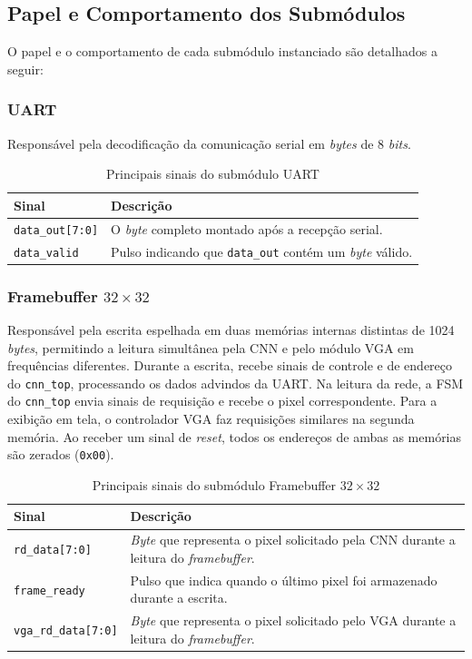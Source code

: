 \subsection{Papel e Comportamento dos Submódulos}

O papel e o comportamento de cada submódulo instanciado são detalhados a seguir:

\subsubsection{UART}
Responsável pela decodificação da comunicação serial em \textit{bytes} de 8 \textit{bits}.

\begin{table}[htbp]
\centering
\caption{Principais sinais do submódulo UART}
\label{tab:sinais_uart}
\small
\begin{tabularx}{\textwidth}{l X}
\toprule
\textbf{Sinal} & \textbf{Descrição} \\
\midrule
\texttt{data\_out[7:0]} & O \textit{byte} completo montado após a recepção serial. \\
\texttt{data\_valid} & Pulso indicando que \texttt{data\_out} contém um \textit{byte} válido. \\
\bottomrule
\end{tabularx}
\end{table}

\subsubsection{Framebuffer $32 \times 32$}
Responsável pela escrita espelhada em duas memórias internas distintas de 1024 \textit{bytes}, permitindo a leitura simultânea pela CNN e pelo módulo VGA em frequências diferentes. Durante a escrita, recebe sinais de controle e de endereço do \texttt{cnn\_top}, processando os dados advindos da UART. Na leitura da rede, a FSM do \texttt{cnn\_top} envia sinais de requisição e recebe o pixel correspondente. Para a exibição em tela, o controlador VGA faz requisições similares na segunda memória. Ao receber um sinal de \textit{reset}, todos os endereços de ambas as memórias são zerados (\texttt{0x00}).
\begin{table}[htbp]
\centering
\caption{Principais sinais do submódulo Framebuffer $32 \times 32$}
\label{tab:sinais_framebuffer}
\small
\begin{tabularx}{\textwidth}{l X}
\toprule
\textbf{Sinal} & \textbf{Descrição} \\
\midrule
\texttt{rd\_data[7:0]} & \textit{Byte} que representa o pixel solicitado pela CNN durante a leitura do \textit{framebuffer}. \\
\texttt{frame\_ready} & Pulso que indica quando o último pixel foi armazenado durante a escrita. \\
\texttt{vga\_rd\_data[7:0]} & \textit{Byte} que representa o pixel solicitado pelo VGA durante a leitura do \textit{framebuffer}. \\
\bottomrule
\end{tabularx}
\end{table}

